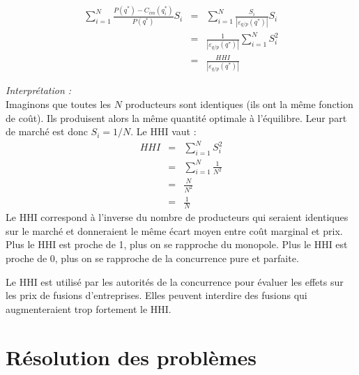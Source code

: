 \documentclass[
]{book}
\theoremstyle{definition}
\theoremstyle{definition}
\theoremstyle{definition}
\theoremstyle{definition}
\theoremstyle{remark}
\begin{document}
\[
 \begin{array}{rcl}
 \sum_{i=1}^{N}\frac{P(q^*) -C_{im}(q_i^*)}{P(q^*)}S_i &=&\sum_{i=1}^{N} \frac{S_i}{\left|\varepsilon_{q/p}(q^*)\right|}S_i \\
 &=&\frac{1}{\left|\varepsilon_{q/p}(q^*)\right|}\sum_{i=1}^NS_i^2\\
 &=&\frac{HHI}{\left|\varepsilon_{q/p}(q^*)\right|}
 \end{array}
 \]

\emph{Interprétation :}\\
Imaginons que toutes les \(N\) producteurs sont identiques (ils ont la même fonction de coût).
Ils produisent alors la même quantité optimale à l'équilibre.
Leur part de marché est donc \(S_i=1/N\).
Le HHI vaut :
\[
\begin{array}{rcl}
HHI&=&\sum_{i=1}^NS_i^2\\
&=&\sum_{i=1}^N\frac{1}{N^2}\\
&=&\frac{N}{N^2} \\
&=&\frac{1}{N}
\end{array}
\]
Le HHI correspond à l'inverse du nombre de producteurs qui seraient identiques sur le marché et donneraient le même écart moyen entre coût marginal et prix.
Plus le HHI est proche de 1, plus on se rapproche du monopole.
Plus le HHI est proche de 0, plus on se rapproche de la concurrence pure et parfaite.

Le HHI est utilisé par les autorités de la concurrence pour évaluer les effets sur les prix de fusions d'entreprises.
Elles peuvent interdire des fusions qui augmenteraient trop fortement le HHI.

\hypertarget{appendix-annexes}{%
\appendix}


\hypertarget{ruxe9solution-des-probluxe8mes}{%
\chapter{Résolution des problèmes}\label{ruxe9solution-des-probluxe8mes}}
\end{document}
